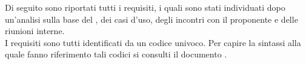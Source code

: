 
Di seguito sono riportati tutti i requisiti, i quali sono stati individuati dopo un'analisi sulla base del , dei casi d'uso, degli incontri con il proponente e delle riunioni interne.\\
I requisiti sono tutti identificati da un codice univoco. Per capire la sintassi alla quale fanno riferimento tali codici si consulti il documento .

%



%
\newpage
{}



